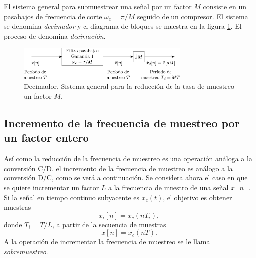 \documentclass[a4paper]{report}
\begin{document}
El sistema general para submuestrear una señal por un factor \(M\) consiste en un pasabajos de frecuencia de corte \(\omega_c=\pi/M\) seguido de un compresor. El sistema se denomina \emph{decimador} y el diagrama de bloques se muestra en la figura \ref{fig:sampling_decimator}. El proceso de denomina \emph{decimación}.
\begin{figure}[!htb]
 \begin{center}
 \includegraphics[width=0.74\textwidth]{figuras/sampling_decimator.pdf}
 \caption{\label{fig:sampling_decimator} Decimador. Sistema general para la reducción de la tasa de muestreo un factor \(M\).}
 \end{center}
\end{figure}

\subsection{Incremento de la frecuencia de muestreo por un factor entero}\label{sec:sampling_upsampling_integer_factor}

Así como la reducción de la frecuencia de muestreo es una operación análoga a la conversión C/D, el incremento de la frecuencia de muestreo es análogo a la conversión D/C, como se verá a continuación. Se considera ahora el caso en que se quiere incrementar un factor \(L\) a la frecuencia de muestro de una señal \(x[n]\). Si la señal en tiempo continuo subyacente es \(x_c(t)\), el objetivo es obtener muestras
\begin{equation}\label{eq:sampling_upsampling_definition}
 x_i[n]=x_c(nT_i), 
\end{equation}
donde \(T_i=T/L\), a partir de la secuencia de muestras
\[
 x[n]=x_c(nT).
\]
A la operación de incrementar la frecuencia de muestreo se le llama \emph{sobremuestreo}.
\end{document}
